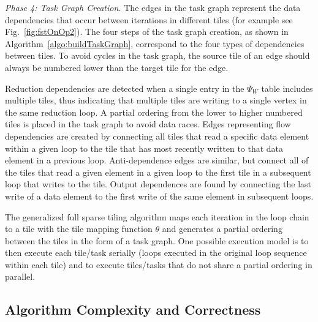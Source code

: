 \emph{Phase 4: Task Graph Creation.} The edges in the task graph 
represent the data dependencies that occur between iterations in different tiles
(for example see Fig.~\ref{fig:fstOnOp2}). 
The four steps of the task graph creation, as shown in Algorithm~\ref{algo:buildTaskGraph}, correspond to the four types of dependencies between tiles. 
To avoid cycles in the task graph, the source tile of an edge should always be
numbered lower than the target tile for the edge.

Reduction dependencies are detected when a single entry in the
$\Psi_W$ table includes multiple tiles, thus indicating that multiple
tiles are writing to a single vertex in the same reduction loop.
A partial ordering from the lower to higher numbered tiles
is placed in the task graph to avoid data races.
Edges representing flow dependencies are created by connecting all 
tiles that read a specific data element within a given loop to the tile that 
has most recently written to that data element in a previous loop. 
Anti-dependence edges are similar, but connect all of the tiles that 
read a given element in a given loop to the first tile in a subsequent 
loop that writes to the tile.
Output dependences are found by connecting the last write of a data 
element to the first write of the same element in subsequent loops.

The generalized full sparse tiling algorithm maps each iteration in the loop chain
to a tile with the tile mapping function $\theta$ and generates a partial
ordering between the tiles in the form of a task graph.
One possible execution model is to then execute each tile/task
serially (loops executed in the original loop sequence within each tile)
and to execute tiles/tasks that do not share a partial ordering in parallel.


\subsection{Algorithm Complexity and Correctness}
\label{sec:correctness}

